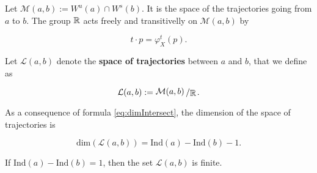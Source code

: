 Let $\mathcal{M}(a,b) := W^u(a) \cap W^s(b)$. It is the space of the trajectories going from $a$ to $b$. The group $\mathbb{R}$ acts freely and transitivelly on $\mathcal{M}(a,b)$ by

\begin{displaymath}
t \cdot p = \varphi_X^t(p) .
\end{displaymath}

\begin{deff}
Let $\mathcal{L}(a,b)$ denote the {\bf space of trajectories} between $a$ and $b$, that we define as

\begin{displaymath}
\mathcal{L}(a,b) := \quocient{\mathcal{M}(a,b)}{\R} .
\end{displaymath}
\end{deff}

\begin{rmrk}
As a consequence of formula \ref{eq:dimIntersect}, the dimension of the space of trajectories is

\begin{displaymath}
\text{dim}(\mathcal{L}(a,b)) = \text{Ind}(a) - \text{Ind}(b) - 1 .
\end{displaymath}
\end{rmrk}

\begin{coro}
If $\text{Ind}(a)-\text{Ind}(b) = 1$, then the set $\mathcal{L}(a,b)$ is finite.
\end{coro}
